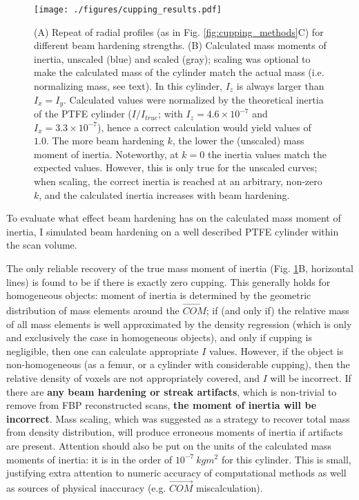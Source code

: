 \begin{figure}[p]
\centering
\texttt{[image: ./figures/cupping\_results.pdf]}
\caption{\label{fig:cupping_results} (A) Repeat of radial profiles (as in Fig. \ref{fig:cupping_methods}C) for different beam hardening strengths. (B) Calculated mass moments of inertia, unscaled (blue) and scaled (gray); scaling was optional to make the calculated mass of the cylinder match the actual mass (i.e. normalizing mass, see text). In this cylinder, \(I_z\) is always larger than \(I_x = I_y\). Calculated values were normalized by the theoretical inertia of the PTFE cylinder (\(I/I_{true}\); with \(I_z = 4.6\times10^{-7}\) and \(I_x = 3.3\times10^{-7}\)), hence a correct calculation would yield values of \(1.0\). The more beam hardening \(k\), the lower the (unscaled) mass moment of inertia. Noteworthy, at \(k=0\) the inertia values match the expected values. However, this is only true for the unscaled curves; when scaling, the correct inertia is reached at an arbitrary, non-zero \(k\), and the calculated inertia increases with beam hardening.}
\end{figure}


To evaluate what effect beam hardening has on the calculated mass moment of inertia, I simulated beam hardening on a well described PTFE cylinder within the scan volume.

The only reliable recovery of the true mass moment of inertia (Fig. \ref{fig:cupping_results}B, horizontal lines) is found to be if there is exactly zero cupping.
This generally holds for homogeneous objects: moment of inertia is determined by the geometric distribution of mass elements around the \(\vec{COM}\); if (and only if) the relative mass of all mass elements is well approximated by the density regression (which is only and exclusively the case in homogeneous objects), and only if cupping is negligible, then one can calculate appropriate \(I\) values.
However, if the object is non-homogeneous (as a femur, or a cylinder with considerable cupping), then the relative density of voxels are not appropriately covered, and \(I\) will be incorrect.
If there are \textbf{any beam hardening or streak artifacts}, which is non-trivial to remove from FBP reconstructed scans, \textbf{the moment of inertia will be incorrect}.
Mass scaling, which was suggested as a strategy to recover total mass from density distribution, will produce erroneous moments of inertia if artifacts are present.
Attention should also be put on the units of the calculated mass moments of inertia: it is in the order of \(10^{-7}\ kg m^2\) for this cylinder.
This is small, justifying extra attention to numeric accuracy of computational methods as well as sources of physical inaccuracy (e.g. \(\vec{COM}\) miscalculation).

